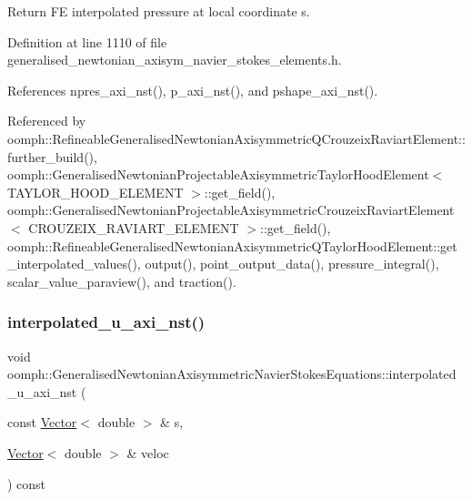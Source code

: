 Return FE interpolated pressure at local coordinate s. 



Definition at line 1110 of file generalised\+\_\+newtonian\+\_\+axisym\+\_\+navier\+\_\+stokes\+\_\+elements.\+h.



References npres\+\_\+axi\+\_\+nst(), p\+\_\+axi\+\_\+nst(), and pshape\+\_\+axi\+\_\+nst().



Referenced by oomph\+::\+Refineable\+Generalised\+Newtonian\+Axisymmetric\+Q\+Crouzeix\+Raviart\+Element\+::further\+\_\+build(), oomph\+::\+Generalised\+Newtonian\+Projectable\+Axisymmetric\+Taylor\+Hood\+Element$<$ T\+A\+Y\+L\+O\+R\+\_\+\+H\+O\+O\+D\+\_\+\+E\+L\+E\+M\+E\+N\+T $>$\+::get\+\_\+field(), oomph\+::\+Generalised\+Newtonian\+Projectable\+Axisymmetric\+Crouzeix\+Raviart\+Element$<$ C\+R\+O\+U\+Z\+E\+I\+X\+\_\+\+R\+A\+V\+I\+A\+R\+T\+\_\+\+E\+L\+E\+M\+E\+N\+T $>$\+::get\+\_\+field(), oomph\+::\+Refineable\+Generalised\+Newtonian\+Axisymmetric\+Q\+Taylor\+Hood\+Element\+::get\+\_\+interpolated\+\_\+values(), output(), point\+\_\+output\+\_\+data(), pressure\+\_\+integral(), scalar\+\_\+value\+\_\+paraview(), and traction().

\mbox{\label{classoomph_1_1GeneralisedNewtonianAxisymmetricNavierStokesEquations_afe5bec055537094e7905554aaf6703fb}} 
\subsubsection{\texorpdfstring{interpolated\+\_\+u\+\_\+axi\+\_\+nst()}{interpolated\_u\_axi\_nst()}\hspace{0.1cm}{\footnotesize\ttfamily [1/3]}}
{\footnotesize\ttfamily void oomph\+::\+Generalised\+Newtonian\+Axisymmetric\+Navier\+Stokes\+Equations\+::interpolated\+\_\+u\+\_\+axi\+\_\+nst (\begin{DoxyParamCaption}\item[{const \hyperlink{classoomph_1_1Vector}{Vector}$<$ double $>$ \&}]{s,  }\item[{\hyperlink{classoomph_1_1Vector}{Vector}$<$ double $>$ \&}]{veloc }\end{DoxyParamCaption}) const\hspace{0.3cm}{\ttfamily [inline]}}



